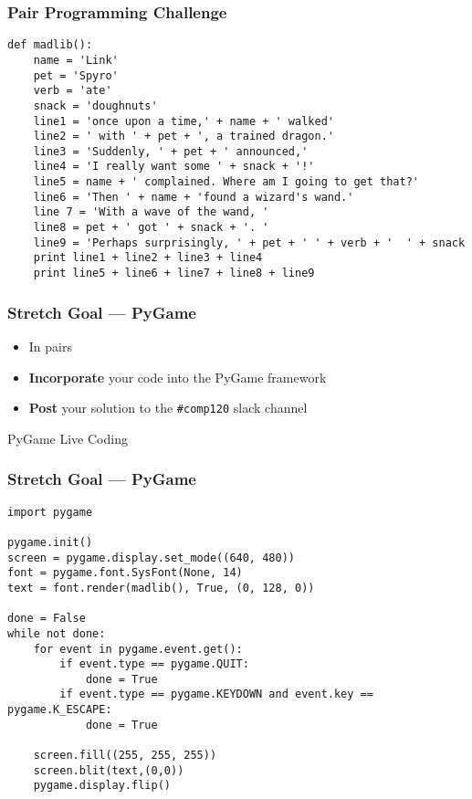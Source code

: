 \begin{frame}[fragile]
	\frametitle{Pair Programming Challenge}
	
	\begin{lstlisting}
def madlib():
	name = 'Link'
	pet = 'Spyro'
	verb = 'ate'
	snack = 'doughnuts'
	line1 = 'once upon a time,' + name + ' walked'
	line2 = ' with ' + pet + ', a trained dragon.'
	line3 = 'Suddenly, ' + pet + ' announced,'
	line4 = 'I really want some ' + snack + '!'
	line5 = name + ' complained. Where am I going to get that?'
	line6 = 'Then ' + name + 'found a wizard's wand.'
	line 7 = 'With a wave of the wand, '
	line8 = pet + ' got ' + snack + '. '
	line9 = 'Perhaps surprisingly, ' + pet + ' ' + verb + '  ' + snack
	print line1 + line2 + line3 + line4
	print line5 + line6 + line7 + line8 + line9

\end{lstlisting}
	
\end{frame}

\begin{frame}[fragile]
	\frametitle{Stretch Goal --- PyGame}
	
	\begin{itemize}
		\item In pairs
		\item \textbf{Incorporate} your code into the PyGame framework
		\item \textbf{Post} your solution to the \lstinline{#comp120} slack channel
	\end{itemize}
	
\end{frame}

\begin{frame}
	\begin{center}
		PyGame Live Coding
	\end{center}
\end{frame}

\begin{frame}[fragile]
	\frametitle{Stretch Goal --- PyGame}
	
	\begin{lstlisting}
import pygame

pygame.init()
screen = pygame.display.set_mode((640, 480))
font = pygame.font.SysFont(None, 14)
text = font.render(madlib(), True, (0, 128, 0))

done = False
while not done:
    for event in pygame.event.get():
        if event.type == pygame.QUIT:
            done = True
        if event.type == pygame.KEYDOWN and event.key == pygame.K_ESCAPE:
            done = True

    screen.fill((255, 255, 255))
    screen.blit(text,(0,0))
    pygame.display.flip()
\end{lstlisting}
	
\end{frame}

